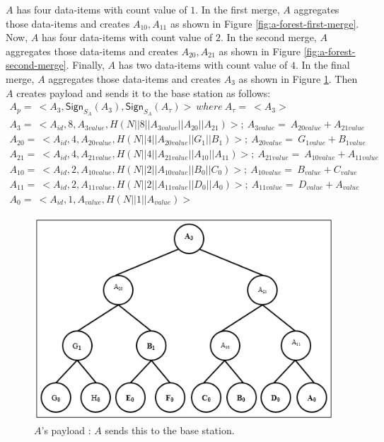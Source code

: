 		$A$ has four data-items with count value of $1$.
		In the first merge, $A$ aggregates those data-items and creates $A_{10},A_{11}$ as shown in Figure \ref{fig:a-forest-first-merge}.
		Now, $A$ has four data-items with count value of $2$.
		In the second merge, $A$ aggregates those data-items and creates $A_{20},A_{21}$ as shown in Figure \ref{fig:a-forest-second-merge}.
		Finally, $A$ has two data-items with count value of $4$.
		In the final merge, $A$ aggregates those data-items and creates $A_{3}$ as shown in Figure \ref{fig:a-payload}.
		Then $A$ creates payload and sends it to the base station as follows:
		\begin{equation}
			\begin{array}{l}
				A_{p} =\ <A_{3},\textsf{Sign}_{S_{A}}(A_{3}),\textsf{Sign}_{S_{A}}(A_{\tau})>\ where\ A_{\tau} =\ <A_{3}>\\
				A_{3} =\ <A_{id}, 8, A_{3value}, H(N||8||A_{3value}||A_{20}||A_{21})>;\ A_{3value} =\ A_{20value} + A_{21value}\\
				A_{20} =\ <A_{id},4,A_{20value},H(N||4||A_{20value}||G_{1}||B_{1})>;\ A_{20value} =\ G_{1value} + B_{1value}\\ 
				A_{21} =\ <A_{id},4,A_{21value},H(N||4||A_{21value}||A_{10}||A_{11})>;\ A_{21value} =\ A_{10value} + A_{11value}\\ 
				A_{10} =\ <A_{id},2,A_{10value},H(N||2||A_{10value}||B_{0}||C_{0})>;\ A_{10value} =\ B_{value} + C_{value}\\
				A_{11} =\ <A_{id},2,A_{11value},H(N||2||A_{11value}||D_{0}||A_{0})>;\ A_{11value} =\ D_{value} + A_{value}\\
				A_{0} =\ <A_{id},1,A_{value},H(N||1||A_{value})>
			\end{array}
		\end{equation}
		\begin{figure}[h!]
			\centering
			\includegraphics[scale=1]{images/a-payload.png}
			\caption{$A$'s payload : $A$ sends this to the base station.}
			\label{fig:a-payload}
		\end{figure}

